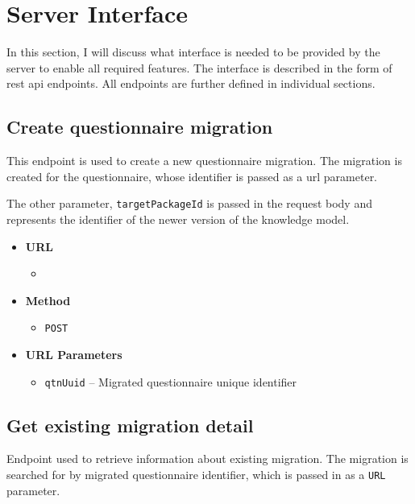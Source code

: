 \section{Server Interface}\label{sec:server-interface}

In this section, I will discuss what interface is needed to be provided by the server to enable all required features.
The interface is described in the form of \gls{rest} \gls{api} endpoints.
All endpoints are further defined in individual sections.

\subsection{Create questionnaire migration}

This endpoint is used to create a new questionnaire migration.
The migration is created for the questionnaire, whose identifier is passed as a \gls{url} parameter.

The other parameter, \texttt{targetPackageId} is passed in the request body and represents the identifier of the newer version of the knowledge model.

\begin{itemize}
    \item \textbf{URL}
        \begin{itemize}
            \item {}
        \end{itemize}

    \item \textbf{Method}
        \begin{itemize}
            \item \texttt{POST}
        \end{itemize}

    \item \textbf{URL Parameters}
        \begin{itemize}
            \item \texttt{qtnUuid} -- Migrated questionnaire unique identifier
        \end{itemize}
\end{itemize}

\subsection{Get existing migration detail}

Endpoint used to retrieve information about existing migration.
The migration is searched for by migrated questionnaire identifier, which is passed in as a \texttt{URL} parameter.

